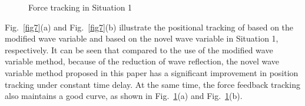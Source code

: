\begin{figure}[htbp]
{\begin{minipage}{0.79\linewidth}
        \end{minipage}
    }
    \caption{Force tracking in Situation 1}
    \label{fig8}
\end{figure}

\par  Fig.~\ref{fig7}(a) and Fig.~\ref{fig7}(b)  illustrate the positional tracking of based on
the modified wave variable and based on the novel wave variable in Situation 1, respectively.
It can be seen that compared to the use of the modified wave variable method, 
because of the reduction of wave reflection,
the novel wave variable method proposed in this paper
has a significant improvement in position tracking under constant time delay.
At the same time,
the force feedback tracking also maintains a good curve,
as shown in Fig.~\ref{fig8}(a) and Fig.~\ref{fig8}(b). 



